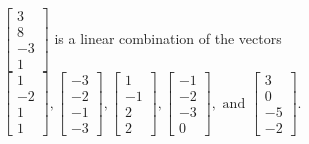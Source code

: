\begin{exercise}
\begin{exerciseStatement}
  \end{exerciseStatement}
  \begin{exerciseAnswer}
   \(\left[\begin{array}{c}
3 \\
8 \\
-3 \\
1
\end{array}\right]\) 
  	 is  
	a linear combination of the vectors \(\left[\begin{array}{c}
1 \\
-2 \\
1 \\
1
\end{array}\right] , \left[\begin{array}{c}
-3 \\
-2 \\
-1 \\
-3
\end{array}\right] , \left[\begin{array}{c}
1 \\
-1 \\
2 \\
2
\end{array}\right] , \left[\begin{array}{c}
-1 \\
-2 \\
-3 \\
0
\end{array}\right] , \text{ and } \left[\begin{array}{c}
3 \\
0 \\
-5 \\
-2
\end{array}\right]\).

	
  


  \end{exerciseAnswer}
\end{exercise}
